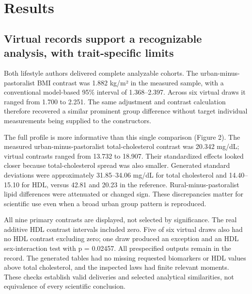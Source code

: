 \documentclass[11pt,letterpaper]{article}
\begin{document}

\section{Results}

\subsection{Virtual records support a recognizable analysis, with trait-specific limits}

Both lifestyle authors delivered complete analyzable cohorts. The urban-minus-pastoralist BMI contrast was 1.882 kg/\allowbreak{}m² in the measured sample, with a conventional model-based 95\% interval of 1.368–\allowbreak{}2.397. Across six virtual draws it ranged from 1.700 to 2.251. The same adjustment and contrast calculation therefore recovered a similar prominent group difference without target individual measurements being supplied to the constructors.


The full profile is more informative than this single comparison (Figure 2). The measured urban-minus-pastoralist total-cholesterol contrast was 20.342 mg/\allowbreak{}dL; virtual contrasts ranged from 13.732 to 18.907. Their standardized effects looked closer because total-cholesterol spread was also smaller. Generated standard deviations were approximately 31.85–\allowbreak{}34.06 mg/\allowbreak{}dL for total cholesterol and 14.40–\allowbreak{}15.10 for HDL, versus 42.81 and 20.23 in the reference. Rural-minus-pastoralist lipid differences were attenuated or changed sign. These discrepancies matter for scientific use even when a broad urban group pattern is reproduced.


All nine primary contrasts are displayed, not selected by significance. The real additive HDL contrast intervals included zero. Five of six virtual draws also had no HDL contrast excluding zero; one draw produced an exception and an HDL sex-interaction test with p = 0.02457. All prespecified outputs remain in the record. The generated tables had no missing requested biomarkers or HDL values above total cholesterol, and the inspected laws had finite relevant moments. These checks establish valid deliveries and selected analytical similarities, not equivalence of every scientific conclusion.
\end{document}
